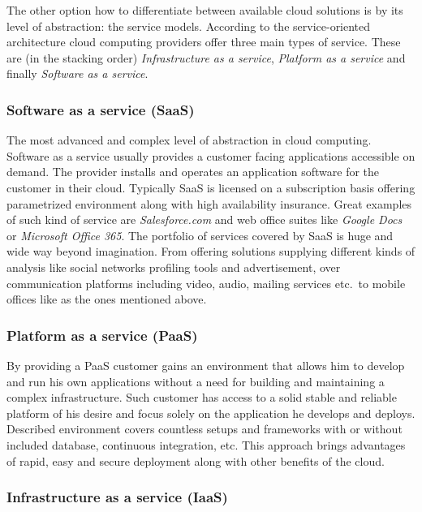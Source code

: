 The other option how to differentiate between available cloud solutions is by its level of abstraction: the service models. According to the service-oriented architecture cloud computing providers offer three main types of service. These are (in the stacking order) \emph{Infrastructure as a service}, \emph{Platform as a service} and finally \emph{Software as a service}.

\subsubsection{Software as a service (SaaS)}
\label{subs:Software as a service (SaaS)}

The most advanced and complex level of abstraction in cloud computing. Software as a service usually provides a customer facing applications accessible on demand. The provider installs and operates an application software for the customer in their cloud. Typically SaaS is licensed on a subscription basis offering parametrized environment along with high availability insurance. Great examples of such kind of service are \emph{Salesforce.com} and web office suites like \emph{Google Docs} or \emph{Microsoft Office 365}. The portfolio of services covered by SaaS is huge and wide way beyond imagination. From offering solutions supplying different kinds of analysis like social networks profiling tools and advertisement, over communication platforms including video, audio, mailing services etc.\ to mobile offices like as the ones mentioned above.

\subsubsection{Platform as a service (PaaS)}
\label{subs:Platform as a service (PaaS)}

By providing a PaaS customer gains an environment that allows him to develop and run his own applications without a need for building and maintaining a complex infrastructure. Such customer has access to a solid stable and reliable platform of his desire and focus solely on the application he develops and deploys. Described environment covers countless setups and frameworks with or without included database, continuous integration, etc. This approach brings advantages of rapid, easy and secure deployment along with other benefits of the cloud.

\subsubsection{Infrastructure as a service (IaaS)}
\label{subs:Infrastructure as a service (IaaS)}

